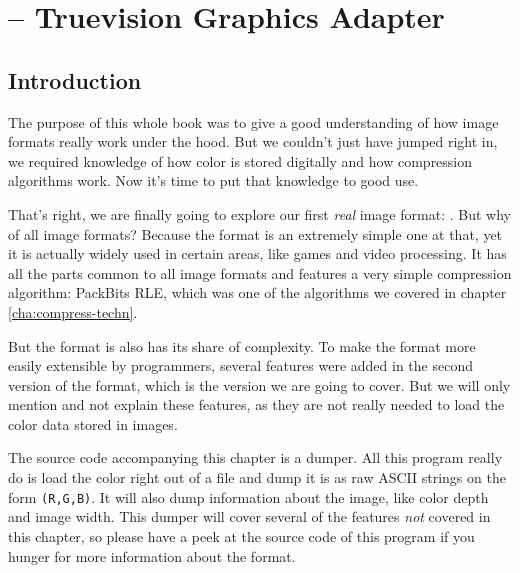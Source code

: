 \begin{comment}
  
\end{comment}

\chapter{\tga{} -- Truevision Graphics Adapter}
\label{cha:tga}

\begin{refsection}

  \section{Introduction}
  \label{sec:tga-introduction}

  The  purpose of this whole book was to give a good understanding of
  how image formats really work under the hood. But we couldn't just
  have jumped right in, we required knowledge of how color is stored
  digitally and how compression algorithms work. Now it's time to put
  that knowledge to good use.

  That's right, we are finally going to explore our first \textit{real} image format:
  \tga{}. But why \tga of all image formats? Because the
  format is an extremely simple one at that, yet it is actually widely
  used in certain areas, like games and video processing. It has all
  the parts common to all image formats and features a very simple
  compression algorithm: PackBits RLE, which was one of the algorithms
  we covered in chapter \ref{cha:compress-techn}.

  But the \tga format is also has its share of complexity. To make the
  format more easily extensible by programmers, several features were
  added in the second version of the format, which is the version we
  are going to cover. But we will only mention and not explain these
  features, as they are not really needed to load the color data
  stored in \tga images.

  The source code accompanying this chapter is a \tga dumper. All this
  program really do is load the color right out of a \tga file and
  dump it is as raw ASCII strings on the form \verb|(R,G,B)|. It will
  also dump information about the image, like color depth and image
  width.  This dumper will cover several of the features \textit{not}
  covered in this chapter, so please have a peek at the source code of
  this program if you hunger for more information about the \tga
  format.


\end{refsection}
